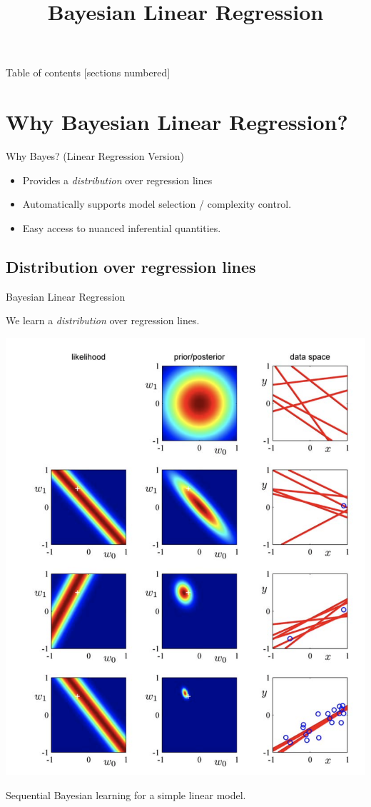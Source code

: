 \documentclass[10pt]{beamer}
\title{Bayesian Linear Regression}
\begin{document}
\maketitle

\begin{frame}{Table of contents}
  [sections numbered]
  \tableofcontents[hideallsubsections]
\end{frame}

\section{Why Bayesian Linear Regression?}
\begin{frame}{Why Bayes? (Linear Regression Version)}
\begin{itemize}
\item Provides a \textit{distribution} over regression lines
\item Automatically supports model selection / complexity control.
\item Easy access to nuanced inferential quantities.
\end{itemize}
	
\end{frame}


\subsection{Distribution over regression lines}
\begin{frame}{Bayesian Linear Regression}
\scriptsize

We learn a \textit{distribution} over regression lines.

\begin{center}
\includegraphics[width=.5\textwidth]{images/bishop_bayesian_regression}

Sequential Bayesian learning for a simple linear model.

\end{center}




\end{frame}
\end{document}
